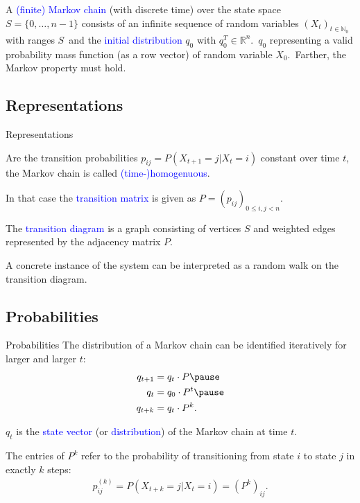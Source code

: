 \documentclass{beamer}
\def\padding{\vspace{0.5cm}}
\def\spadding{\vspace{0.25cm}}
\def\b{\textcolor{blue}}
\begin{document}
\begin{frame}
    \begin{definition}
        A \b{(finite) Markov chain} (with discrete time) over the state space $S = \{0, \dots, n-1\}$ consists of an infinite sequence of random variables $(X_t)_{t \in \mathbb{N}_0}$ with ranges $S$\pause\ and the \b{initial distribution} $q_0$ with $q_0^T \in \mathbb{R}^n$.\pause\ $q_0$ representing a valid probability mass function (as a row vector) of random variable $X_0$.\pause\ Farther, the Markov property must hold.
    \end{definition}
\end{frame}

\subsection{Representations}
\begin{frame}{Representations}
    \begin{definition}
        Are the transition probabilities $p_{ij} = P(X_{t+1} = j | X_t = i)$ constant over time $t$, the Markov chain is called \b{(time-)homogenuous}.\par\pause\spadding
        In that case the \b{transition matrix} is given as $P = (p_{ij})_{0 \leq i, j < n}$.\par\pause\spadding
        The \b{transition diagram} is a graph consisting of vertices $S$ and weighted edges represented by the adjacency matrix $P$.
    \end{definition}\par\pause\padding
    A concrete instance of the system can be interpreted as a random walk on the transition diagram.
\end{frame}

\subsection{Probabilities}
\begin{frame}{Probabilities}
    The distribution of a Markov chain can be identified iteratively for larger and larger $t$:
    \begin{align*}
        q_{t+1} &= q_t \cdot P\pause \\
        q_t     &= q_0 \cdot P^t\pause \\
        q_{t+k} &= q_t \cdot P^k.
    \end{align*}\pause
    \begin{definition}
        $q_t$ is the \b{state vector} (or \b{distribution}) of the Markov chain at time $t$.
    \end{definition}\par\pause\padding
    The entries of $P^k$ refer to the probability of transitioning from state $i$ to state $j$ in exactly $k$ steps:
    \begin{align*}
        p_{ij}^{(k)} = P(X_{t+k} = j | X_t = i) = (P^k)_{ij}.
    \end{align*}
\end{frame}
\end{document}
